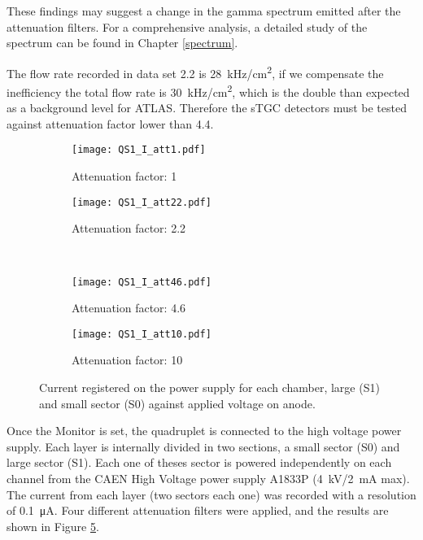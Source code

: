 These findings may suggest a change in the gamma spectrum emitted after the attenuation filters.  For a comprehensive
analysis, a detailed study of the spectrum can be found in Chapter \ref{spectrum}.\par


The flow rate recorded in data set 2.2 is \SI{28}{kHz/cm^2}, if we compensate the inefficiency the total flow rate is
\SI{30}{kHz/cm^2}, which is the double than expected as a background level for ATLAS. Therefore the sTGC detectors must
be tested against attenuation factor lower than 4.4.\par


\begin{figure}[t]
		\hspace*{\fill}
		\begin{subfigure}[b]{0.45\textwidth}
			\centering
			\texttt{[image: QS1\_I\_att1.pdf]}
			\caption{Attenuation factor: 1}\label{fig:att1}
		\end{subfigure}
		\hfill
		\begin{subfigure}[b]{0.45\textwidth}
			\centering
			\texttt{[image: QS1\_I\_att22.pdf]}
			\caption{Attenuation factor: 2.2}\label{fig:att22}
		\end{subfigure}
		\hspace*{\fill}\\
		\hspace*{\fill}
		\begin{subfigure}[b]{0.45\textwidth}
			\centering
			\texttt{[image: QS1\_I\_att46.pdf]}
			\caption{Attenuation factor: 4.6}\label{fig:att46}
		\end{subfigure}
		\hfill
		\begin{subfigure}[b]{0.45\textwidth}
			\centering
			\texttt{[image: QS1\_I\_att10.pdf]}
			\caption{Attenuation factor: 10}\label{fig:att10}
		\end{subfigure}
		\hspace*{\fill}
		\caption{Current registered on the power supply for each chamber, large (S1) and small sector (S0) against applied
		voltage on anode. }\label{gifresult}
\end{figure}

Once the Monitor is set, the quadruplet is connected to the high voltage power supply. Each layer is internally divided
in two sections, a small sector (S0) and large sector (S1). Each one of theses sector is powered independently on each
channel from the CAEN High Voltage power supply A1833P (\SI{4}{kV}/\SI{2}{mA} max). The current from each layer (two sectors
each one)	was recorded with a resolution of \SI{0.1}{\micro A}. Four different attenuation filters were applied, and the
results are shown in Figure \ref{gifresult}. \par

